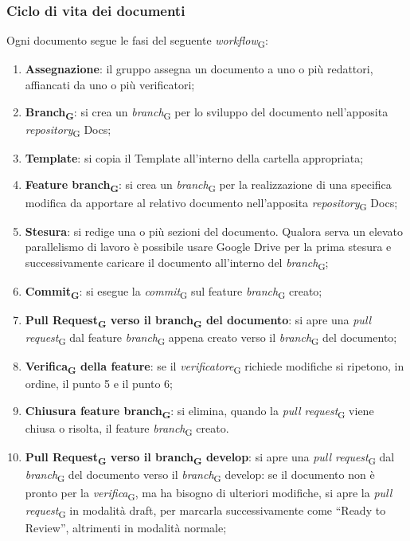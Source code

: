 \subsubsection{Ciclo di vita dei documenti}
Ogni documento segue le fasi del seguente \textit{workflow}\textsubscript{G}:
\begin{enumerate}
    \item \textbf{Assegnazione}: il gruppo assegna un documento a uno o più redattori, affiancati da uno o più verificatori;
    \item \textbf{Branch\textsubscript{G}}: si crea un \textit{branch}\textsubscript{G} per lo sviluppo del documento nell’apposita \textit{repository}\textsubscript{G} Docs;
    \item \textbf{Template}: si copia il Template all'interno della cartella appropriata;
    \item \textbf{Feature branch\textsubscript{G}}: si crea un \textit{branch}\textsubscript{G} per la realizzazione di una specifica modifica da apportare al relativo documento nell’apposita \textit{repository}\textsubscript{G} Docs;
    \item \textbf{Stesura}: si redige una o più sezioni del documento. Qualora serva un elevato parallelismo di lavoro è possibile usare Google Drive per la prima stesura e successivamente caricare il documento all’interno del \textit{branch}\textsubscript{G};
    \item \textbf{Commit\textsubscript{G}}: si esegue la \textit{commit}\textsubscript{G} sul feature \textit{branch}\textsubscript{G} creato;
    \item \textbf{Pull Request\textsubscript{G} verso il branch\textsubscript{G} del documento}: si apre una \textit{pull request}\textsubscript{G} dal feature \textit{branch}\textsubscript{G} appena creato verso il \textit{branch}\textsubscript{G} del documento;
    \item \textbf{Verifica\textsubscript{G} della feature}: se il \textit{verificatore}\textsubscript{G} richiede modifiche si ripetono, in ordine, il punto 5 e il punto 6;
    \item \textbf{Chiusura feature branch\textsubscript{G}}: si elimina, quando la \textit{pull request}\textsubscript{G} viene chiusa o risolta, il feature \textit{branch}\textsubscript{G} creato.
    \item \textbf{Pull Request\textsubscript{G} verso il branch\textsubscript{G} develop}: si apre una \textit{pull request}\textsubscript{G} dal \textit{branch}\textsubscript{G} del documento verso il \textit{branch}\textsubscript{G} develop: se il documento non è pronto per la \textit{verifica}\textsubscript{G}, ma ha bisogno di ulteriori modifiche, si apre la \textit{pull request}\textsubscript{G} in modalità draft, per marcarla successivamente come “Ready to Review”, altrimenti in modalità normale;

\end{enumerate}

